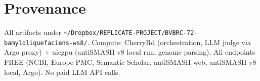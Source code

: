 \documentclass[11pt]{article}
\begin{document}
\section{Provenance}
All artifacts under \texttt{\textasciitilde/Dropbox/REPLICATE-PROJECT/BVBRC-72-bamyloliquefaciens-ws8/}. Compute: CherryRd (orchestration, LLM judge via Argo proxy) + uicgpu (antiSMASH v8 local run, genome parsing). All endpoints FREE (NCBI, Europe PMC, Semantic Scholar, antiSMASH web, antiSMASH v8 local, Argo). No paid LLM API calls.
\end{document}
